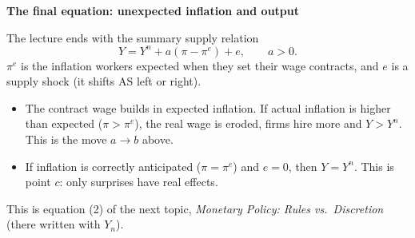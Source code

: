 \documentclass[11pt,letterpaper]{article}
\newcommand{\topic}[1]{\par\Needspace{4\baselineskip}\medskip\textbf{#1}\par\nobreak}
\begin{document}
\topic{The final equation: unexpected inflation and output}
The lecture ends with the summary supply relation
\begin{equation}
 \boxed{Y=Y^n+a(\pi-\pi^e)+e,\qquad a>0.}
 \label{eq:surprise}
\end{equation}
$\pi^e$ is the inflation workers expected when they set their wage contracts,
and $e$ is a supply shock (it shifts AS left or right).
\begin{itemize}
 \item The contract wage builds in expected inflation. If actual inflation is
 higher than expected ($\pi>\pi^e$), the real wage is eroded, firms hire more and
 $Y>Y^n$. This is the move $a\to b$ above.
 \item If inflation is correctly anticipated ($\pi=\pi^e$) and $e=0$, then
 $Y=Y^n$. This is point $c$: only surprises have real effects.
\end{itemize}
This is equation (2) of the next topic, \emph{Monetary Policy: Rules vs.\ Discretion} (there written with $Y_n$).
\end{document}
